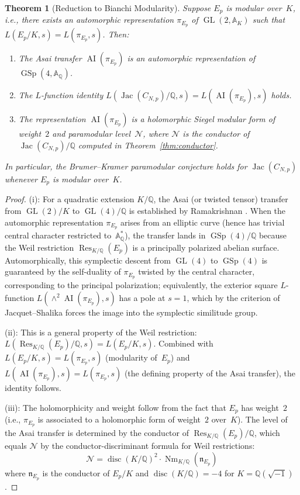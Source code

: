 \documentclass[11pt,a4paper]{article}
\newtheorem{theorem}{Theorem}[section]
\theoremstyle{definition}
\DeclareMathOperator{\GL}{GL}
\DeclareMathOperator{\GSp}{GSp}
\DeclareMathOperator{\Jac}{Jac}
\DeclareMathOperator{\Res}{Res}
\DeclareMathOperator{\Nm}{Nm}
\DeclareMathOperator{\AI}{AI}
\DeclareMathOperator{\disc}{disc}
\begin{document}
\begin{theorem}[Reduction to Bianchi Modularity]\label{thm:reduction}
Suppose $E_p$ is modular over~$K$, i.e., there exists an automorphic representation $\pi_{E_p}$ of $\GL(2, \mathbb{A}_K)$ such that $L(E_p/K, s) = L(\pi_{E_p}, s)$. Then:
\begin{enumerate}
    \item[\textup{(i)}] The Asai transfer $\AI(\pi_{E_p})$ is an automorphic representation of $\GSp(4, \mathbb{A}_\mathbb{Q})$.
    \item[\textup{(ii)}] The $L$-function identity $L(\Jac(C_{N,p})/\mathbb{Q}, s) = L(\AI(\pi_{E_p}), s)$ holds.
    \item[\textup{(iii)}] The representation $\AI(\pi_{E_p})$ is a holomorphic Siegel modular form of weight~$2$ and paramodular level~$\mathcal{N}$, where $\mathcal{N}$ is the conductor of $\Jac(C_{N,p})/\mathbb{Q}$ computed in Theorem~\ref{thm:conductor}.
\end{enumerate}
In particular, the Brumer--Kramer paramodular conjecture holds for $\Jac(C_{N,p})$ whenever $E_p$ is modular over~$K$.
\end{theorem}
\begin{proof}
(i): For a quadratic extension $K/\mathbb{Q}$, the Asai (or twisted tensor) transfer from $\GL(2)/K$ to $\GL(4)/\mathbb{Q}$ is established by Ramakrishnan \cite{Ramakrishnan}. When the automorphic representation $\pi_{E_p}$ arises from an elliptic curve (hence has trivial central character restricted to~$\mathbb{A}_\mathbb{Q}^*$), the transfer lands in $\GSp(4)/\mathbb{Q}$ because the Weil restriction $\Res_{K/\mathbb{Q}}(E_p)$ is a principally polarized abelian surface. Automorphically, this symplectic descent from $\GL(4)$ to $\GSp(4)$ is guaranteed by the self-duality of $\pi_{E_p}$ twisted by the central character, corresponding to the principal polarization; equivalently, the exterior square $L$-function $L(\wedge^2 \AI(\pi_{E_p}), s)$ has a pole at $s = 1$, which by the criterion of Jacquet--Shalika forces the image into the symplectic similitude group.

(ii): This is a general property of the Weil restriction: $L(\Res_{K/\mathbb{Q}}(E_p)/\mathbb{Q}, s) = L(E_p/K, s)$. Combined with $L(E_p/K, s) = L(\pi_{E_p}, s)$ (modularity of~$E_p$) and $L(\AI(\pi_{E_p}), s) = L(\pi_{E_p}, s)$ (the defining property of the Asai transfer), the identity follows.

(iii): The holomorphicity and weight follow from the fact that $E_p$ has weight~$2$ (i.e., $\pi_{E_p}$ is associated to a holomorphic form of weight~$2$ over~$K$). The level of the Asai transfer is determined by the conductor of $\Res_{K/\mathbb{Q}}(E_p)/\mathbb{Q}$, which equals $\mathcal{N}$ by the conductor-discriminant formula for Weil restrictions:
$$\mathcal{N} = \disc(K/\mathbb{Q})^2 \cdot \Nm_{K/\mathbb{Q}}(\mathfrak{n}_{E_p})$$
where $\mathfrak{n}_{E_p}$ is the conductor of $E_p/K$ and $\disc(K/\mathbb{Q}) = -4$ for $K = \mathbb{Q}(\sqrt{-1})$. \qedhere
\end{proof}
\end{document}
